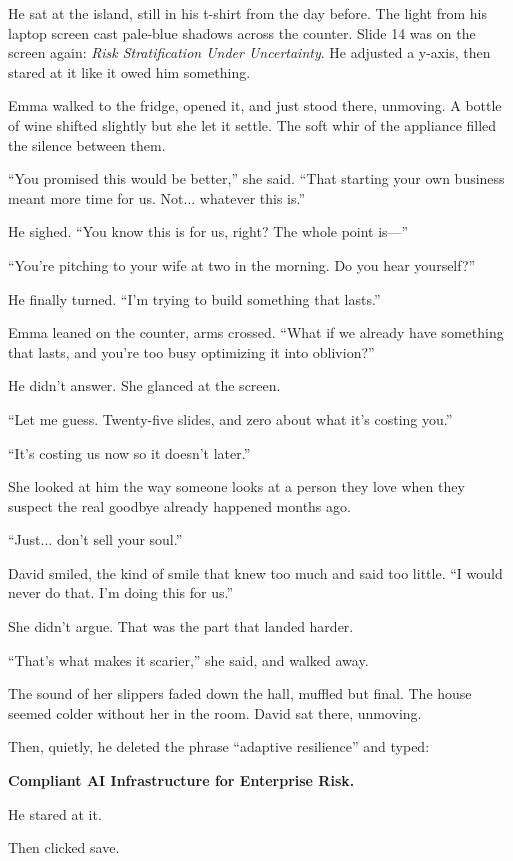 He sat at the island, still in his t-shirt from the day before. The light from his laptop screen cast pale-blue shadows 
across the counter. Slide 14 was on the screen again: \textit{Risk Stratification Under Uncertainty}. He adjusted a 
y-axis, then stared at it like it owed him something.

Emma walked to the fridge, opened it, and just stood there, unmoving. A bottle of wine shifted slightly but she let it 
settle. The soft whir of the appliance filled the silence between them.

“You promised this would be better,” she said. “That starting your own business meant more time for us. Not... 
whatever this is.”

He sighed. “You know this is for us, right? The whole point is—”

“You’re pitching to your wife at two in the morning. Do you hear yourself?”

He finally turned. “I’m trying to build something that lasts.”

Emma leaned on the counter, arms crossed. “What if we already have something that lasts, and you’re too busy optimizing 
it into oblivion?”

He didn’t answer. She glanced at the screen.

“Let me guess. Twenty-five slides, and zero about what it’s costing you.”

“It’s costing us now so it doesn’t later.”

She looked at him the way someone looks at a person they love when they suspect the real goodbye already 
happened months ago.

“Just... don’t sell your soul.”

David smiled, the kind of smile that knew too much and said too little. “I would never do that. I’m doing this for us.”

She didn’t argue. That was the part that landed harder.

“That’s what makes it scarier,” she said, and walked away.

The sound of her slippers faded down the hall, muffled but final. The house seemed colder without her in the room. 
David sat there, unmoving.

Then, quietly, he deleted the phrase “adaptive resilience” and typed:

\textbf{Compliant AI Infrastructure for Enterprise Risk.}

He stared at it.

Then clicked save.


